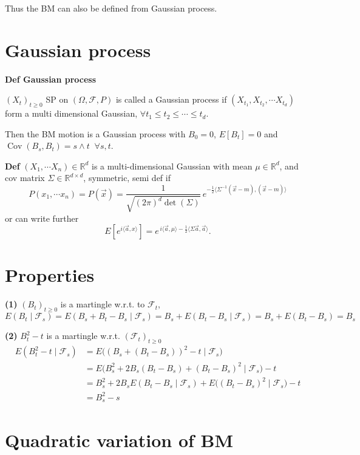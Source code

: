 \documentclass[
  letterpaper,
  DIV=11,
  numbers=noendperiod]{scrreprt}
\theoremstyle{definition}
\theoremstyle{plain}
\theoremstyle{plain}
\theoremstyle{definition}
\theoremstyle{plain}
\theoremstyle{plain}
\theoremstyle{remark}
\begin{document}
Thus the BM can also be defined from Gaussian process.

\section{Gaussian process}\label{gaussian-process}

\textbf{Def Gaussian process}

\((X_t)_{t \geq 0}\) SP on \((\Omega, \mathcal{F}, P)\) is called a
Gaussian process if \((X_{t_1}, X_{t_2}, \cdots X_{t_d})\) form a multi
dimensional Gaussian, \(\forall t_1 \leq t_2 \leq \cdots \leq t_d\).

Then the BM motion is a Gaussian process with \(B_0 = 0\),
\(E[B_t] = 0\) and \(\operatorname{Cov}(B_s, B_t) = s \wedge t\)
\(\ \forall s, t\).

\textbf{Def} \((X_1, \cdots X_n) \in \mathbb{R}^d\) is a
multi-dimensional Gaussian with mean \(\mu \in \mathbb{R}^d\), and cov
matrix \(\Sigma \in \mathbb{R}^{d \times d}\), symmetric, semi def if \[
P(x_1, \cdots x_n) = P(\vec{x}) = \frac{1}{\sqrt{(2\pi)^d \det(\Sigma)}} \, e^{-\frac12 \langle \Sigma^{-1}(\vec{x} - m), (\vec{x} - m)\rangle}
\] or can write further \[
E[e^{i \langle \vec{a}, x\rangle}] = e^{\, i \langle \vec{a}, \mu\rangle - \frac12 \langle \Sigma \vec{a}, \vec{a}\rangle}.
\]

\section{Properties}\label{properties}

\textbf{(1)} \((B_t)_{t \geq 0}\) is a martingle w.r.t. to
\(\mathcal{F}_t\), \[
E(B_t \mid \mathcal{F}_s) = E(B_s + B_t - B_s \mid \mathcal{F}_s) = B_s + E(B_t - B_s \mid \mathcal{F}_s) = B_s + E(B_t - B_s) = B_s
\]

\textbf{(2)} \(B_t^2 - t\) is a martingle w.r.t.
\((\mathcal{F}_t)_{t \geq 0}\) \[
\begin{aligned}
E(B_t^2 - t \mid \mathcal{F}_s) &= E\big((B_s + (B_t - B_s))^2 - t \mid \mathcal{F}_s\big) \\
&= E\big(B_s^2 + 2B_s(B_t - B_s) + (B_t - B_s)^2 \mid \mathcal{F}_s\big) - t \\
&= B_s^2 + 2B_s E(B_t - B_s \mid \mathcal{F}_s) + E\big((B_t - B_s)^2 \mid \mathcal{F}_s\big) - t \\
&= B_s^2 - s
\end{aligned}
\]

\section{Quadratic variation of BM}\label{quadratic-variation-of-bm}
\end{document}
